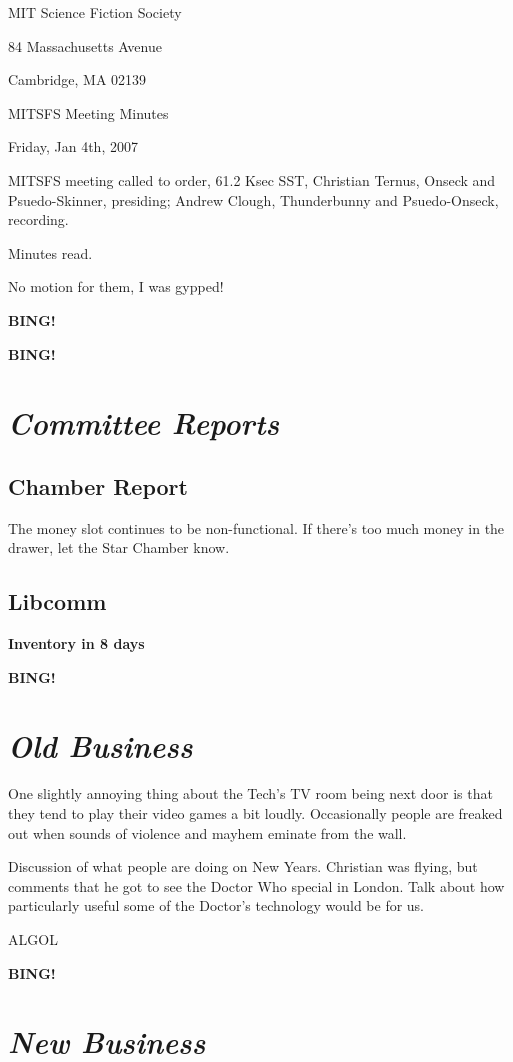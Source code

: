 \documentclass[10pt]{article}
\newcommand{\bing}{{\bf BING!} }
\newcommand{\goto}[1]{\bing \vskip 12pt \section*{{\em{#1}}}}
\begin{document}
\begin{center}

MIT Science Fiction Society

84 Massachusetts Avenue

Cambridge, MA 02139

\vspace{12pt}

MITSFS Meeting Minutes

Friday, Jan 4th, 2007

\end{center}

\vspace{18pt}

\setlength{\parskip}{6pt}

\noindent
MITSFS meeting called to order, 61.2 Ksec SST,
Christian Ternus, Onseck and Psuedo-Skinner, presiding; Andrew Clough, Thunderbunny and Psuedo-Onseck, recording.

Minutes read.

No motion for them, I was gypped!

\bing

\goto{Committee Reports}

\subsection*{Chamber Report}

The money slot continues to be non-functional.  If there's too much
money in the drawer, let the Star Chamber know.

\subsection*{Libcomm}

\textbf{Inventory in 8 days}

\goto{Old Business}

One slightly annoying thing about the Tech's TV room being next door
is that they tend to play their video games a bit loudly.
Occasionally people are freaked out when sounds of violence and mayhem
eminate from the wall.

Discussion of what people are doing on New Years.  Christian was
flying, but comments that he got to see the Doctor Who special in
London.  Talk about how particularly useful some of the Doctor's
technology would be for us.

ALGOL

\goto{New Business}
\end{document}
